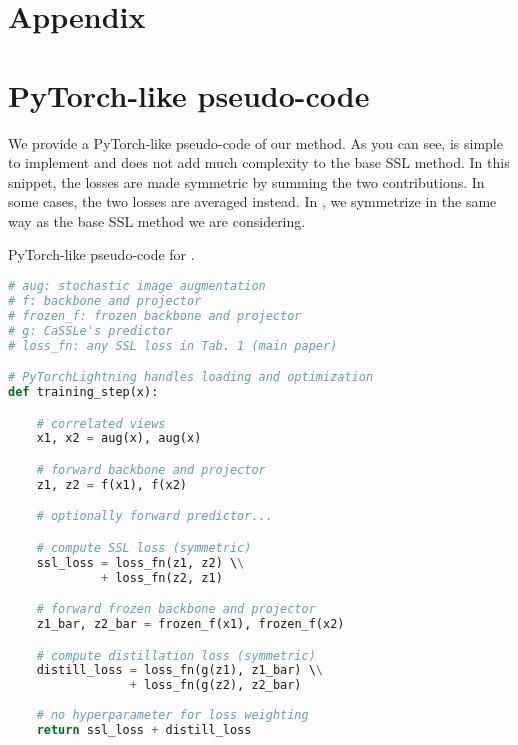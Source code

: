 




\renewcommand\thesection{\Alph{section}}
\renewcommand\thefigure{\Alph{figure}}
\renewcommand\thetable{\Alph{table}}
\setcounter{section}{0}
\setcounter{figure}{0}
\setcounter{table}{0}

\section*{Appendix}

\section{PyTorch-like pseudo-code}
We provide a PyTorch-like pseudo-code of our method. As you can see, \name{} is simple to implement and does not add much complexity to the base SSL method. In this snippet, the losses are made symmetric by summing the two contributions. In some cases, the two losses are averaged instead. In \name{}, we symmetrize in the same way as the base SSL method we are considering.
\begin{algorithm}[h]

   \caption{PyTorch-like pseudo-code for \name{}.}
   \label{algo:DINO}
\begin{lstlisting}[language=python]
# aug: stochastic image augmentation
# f: backbone and projector
# frozen_f: frozen backbone and projector
# g: CaSSLe's predictor
# loss_fn: any SSL loss in Tab. 1 (main paper)

# PyTorchLightning handles loading and optimization
def training_step(x):

    # correlated views
    x1, x2 = aug(x), aug(x)

    # forward backbone and projector
    z1, z2 = f(x1), f(x2)

    # optionally forward predictor...

    # compute SSL loss (symmetric)
    ssl_loss = loss_fn(z1, z2) \\
             + loss_fn(z2, z1)

    # forward frozen backbone and projector
    z1_bar, z2_bar = frozen_f(x1), frozen_f(x2)

    # compute distillation loss (symmetric)
    distill_loss = loss_fn(g(z1), z1_bar) \\
                 + loss_fn(g(z2), z2_bar)
    
    # no hyperparameter for loss weighting
    return ssl_loss + distill_loss
\end{lstlisting}
\end{algorithm}

